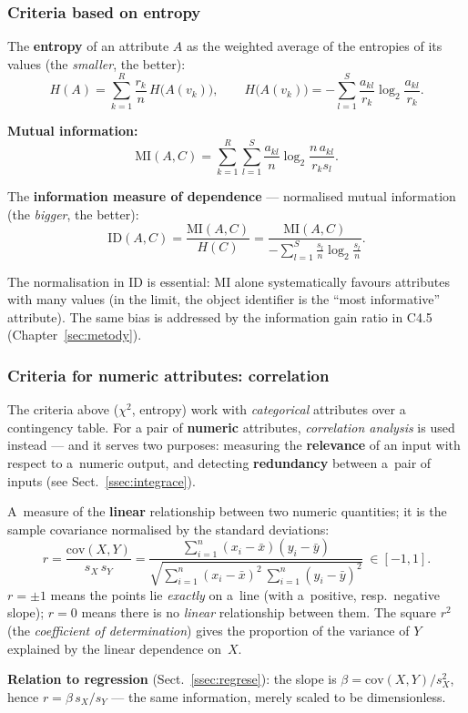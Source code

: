 \documentclass[11pt,a4paper]{article}
\theoremstyle{definition}
\providecommand{\uv}[1]{``#1''}
\begin{document}
\subsubsection{Criteria based on entropy}

\begin{defbox}
The \textbf{entropy} of an attribute $A$ as the weighted average of the entropies of its values
(the \emph{smaller}, the better):
\[ H(A)=\sum_{k=1}^{R}\frac{r_k}{n}\,H\big(A(v_k)\big),\qquad
   H\big(A(v_k)\big)=-\sum_{l=1}^{S}\frac{a_{kl}}{r_k}\log_2\frac{a_{kl}}{r_k}. \]

\textbf{Mutual information:}
\[ \mathrm{MI}(A,C)=\sum_{k=1}^{R}\sum_{l=1}^{S}\frac{a_{kl}}{n}
   \log_2\frac{n\,a_{kl}}{r_k s_l}. \]

The \textbf{information measure of dependence} --- normalised mutual information (the
\emph{bigger}, the better):
\[ \mathrm{ID}(A,C)=\frac{\mathrm{MI}(A,C)}{H(C)}
   =\frac{\mathrm{MI}(A,C)}{-\sum_{l=1}^{S}\frac{s_l}{n}\log_2\frac{s_l}{n}}. \]
\end{defbox}

The normalisation in $\mathrm{ID}$ is essential: $\mathrm{MI}$ alone systematically favours
attributes with many values (in the limit, the object identifier is the \uv{most informative}
attribute). The same bias is addressed by the information gain ratio in C4.5
(Chapter~\ref{sec:metody}).

\subsubsection{Criteria for numeric attributes: correlation}
\label{ssec:korelace}

The criteria above ($\chi^2$, entropy) work with \emph{categorical} attributes over a contingency
table. For a pair of \textbf{numeric} attributes, \emph{correlation analysis} is used instead ---
and it serves two purposes: measuring the \textbf{relevance} of an input with respect to
a~numeric output, and detecting \textbf{redundancy} between a~pair of inputs
(see Sect.~\ref{ssec:integrace}).

\begin{defbox}
A~measure of the \textbf{linear} relationship between two numeric quantities; it is the sample
covariance normalised by the standard deviations:
\[ r=\frac{\mathrm{cov}(X,Y)}{s_X\,s_Y}
   =\frac{\sum_{i=1}^{n}(x_i-\bar x)(y_i-\bar y)}
          {\sqrt{\sum_{i=1}^{n}(x_i-\bar x)^2\ \sum_{i=1}^{n}(y_i-\bar y)^2}}\ \in[-1,1]. \]
$r=\pm 1$ means the points lie \emph{exactly} on a~line (with a~positive, resp.\ negative
slope); $r=0$ means there is no \emph{linear} relationship between them. The square $r^2$ (the
\emph{coefficient of determination}) gives the proportion of the variance of $Y$ explained by
the linear dependence on~$X$.

\textbf{Relation to regression} (Sect.~\ref{ssec:regrese}): the slope is
$\beta=\mathrm{cov}(X,Y)/s_X^2$, hence $r=\beta\,s_X/s_Y$ --- the same information, merely
scaled to be dimensionless.
\end{defbox}
\end{document}
